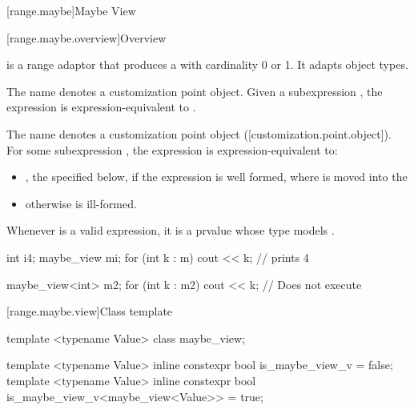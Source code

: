 \documentclass[a4paper,10pt,oneside,openany,final,article]{memoir}
\begin{document}
\begin{wording}
\begin{adjustwidth}{1cm}{1cm}
\begin{addedblock}
\begin{codeblock}
    \end{codeblock}
  \end{addedblock}
\end{adjustwidth}

[range.maybe]{Maybe View}

[range.maybe.overview]{Overview}

\pnum
{} is a range adaptor that produces a  with cardinality 0 or 1. It adapts  object types.


\pnum
{}%
The name  denotes a
customization point object.
Given a subexpression , the expression
 is expression-equivalent to
.

The name  denotes a customization point object ([customization.point.object]). For some subexpression , the expression  is expression-equivalent to:
\begin{itemize}
\item
  , the  specified below, if the expression is well formed, where  is moved into the 
\item
 otherwise  is ill-formed.
\end{itemize}


\begin{note}
  Whenever  is a valid expression, it is a prvalue whose type models .
\end{note}
\pnum

\begin{example}
  \begin{codeblock}
  int i{4};
  maybe_view m{i};
  for (int k : m) {
    cout << k;        // prints 4
  }

  maybe_view<int> m2{};
  for (int k : m2) {
    cout << k;        // Does not execute
  }
\end{codeblock}
\end{example}

[range.maybe.view]{Class template }

\begin{codeblock}

template <typename Value>
class maybe_view;

template <typename Value>
inline constexpr bool is_maybe_view_v = false;
template <typename Value>
inline constexpr bool is_maybe_view_v<maybe_view<Value>> = true;


\end{codeblock}
\end{wording}
\end{document}
